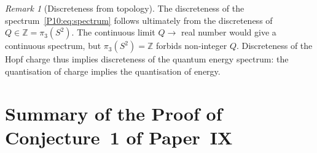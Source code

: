 \documentclass[11pt,a4paper]{article}
\theoremstyle{definition}
\theoremstyle{remark}
\newtheorem{remark}[theorem]{Remark}
\newcommand{\ZZ}{\mathbb{Z}}
\begin{document}
\begin{remark}[Discreteness from topology]
\label{P10:rem:discreteness_from_topology}
The discreteness of the spectrum~\eqref{P10:eq:spectrum} follows ultimately
from the discreteness of $Q\in\ZZ=\pi_3(S^2)$.
The continuous limit $Q\to$ real number would give a continuous
spectrum, but $\pi_3(S^2)=\ZZ$ forbids non-integer $Q$.
Discreteness of the Hopf charge thus implies discreteness of the
quantum energy spectrum: the quantisation of charge implies
the quantisation of energy.
\end{remark}

\section{Summary of the Proof of Conjecture~1 of Paper~IX}
\label{P10:sec:proof_summary}
\end{document}
